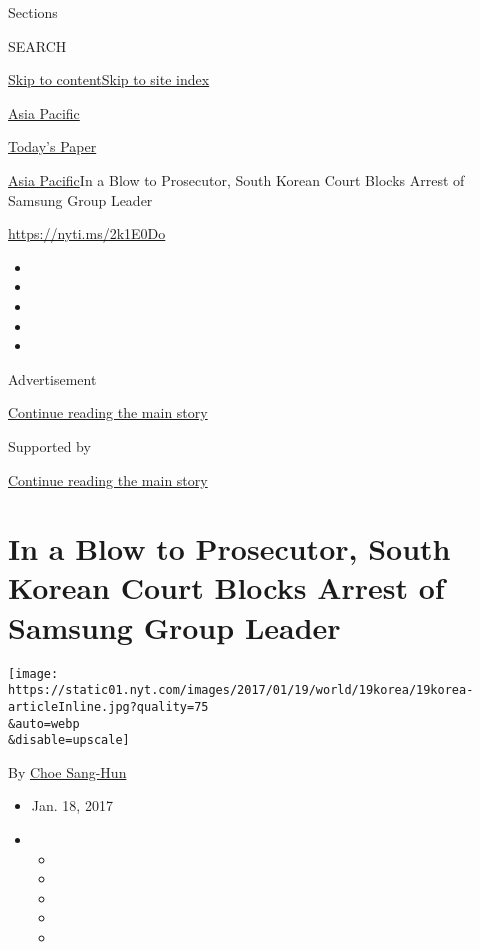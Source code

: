Sections

SEARCH

\protect\hyperlink{site-content}{Skip to
content}\protect\hyperlink{site-index}{Skip to site index}

\href{https://www.nytimes.com/section/world/asia}{Asia Pacific}

\href{https://myaccount.nytimes.com/auth/login?response_type=cookie\&client_id=vi}{}

\href{https://www.nytimes.com/section/todayspaper}{Today's Paper}

\href{/section/world/asia}{Asia Pacific}\textbar{}In a Blow to
Prosecutor, South Korean Court Blocks Arrest of Samsung Group Leader

\url{https://nyti.ms/2k1E0Do}

\begin{itemize}
\item
\item
\item
\item
\item
\end{itemize}

Advertisement

\protect\hyperlink{after-top}{Continue reading the main story}

Supported by

\protect\hyperlink{after-sponsor}{Continue reading the main story}

\hypertarget{in-a-blow-to-prosecutor-south-korean-court-blocks-arrest-of-samsung-group-leader}{%
\section{In a Blow to Prosecutor, South Korean Court Blocks Arrest of
Samsung Group
Leader}\label{in-a-blow-to-prosecutor-south-korean-court-blocks-arrest-of-samsung-group-leader}}

\texttt{[image: https://static01.nyt.com/images/2017/01/19/world/19korea/19korea-articleInline.jpg?quality=75\\\&auto=webp\\\&disable=upscale]}

By \href{http://www.nytimes.com/by/choe-sang-hun}{Choe Sang-Hun}

\begin{itemize}
\item
  Jan. 18, 2017
\item
  \begin{itemize}
  \item
  \item
  \item
  \item
  \item
  \end{itemize}
\end{itemize}

